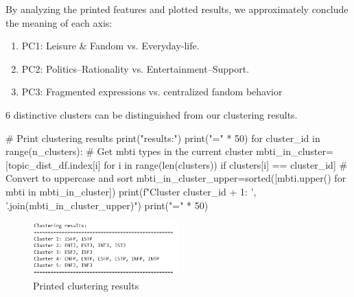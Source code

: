 \documentclass[12pt]{article}
\numberwithin{figure}{section}  %
\begin{document}
	By analyzing the printed features and plotted results, we approximately
	conclude the meaning of each axis:
	\begin{enumerate}
	\item PC1: Leisure \& Fandom vs. Everyday-life.
	\item PC2: Politics–Rationality vs. Entertainment–Support.
	\item PC3: Fragmented expressions vs. centralized fandom behavior
	\end{enumerate}
	
	6 distinctive clusters can be distinguished from our clustering results.
	\begin{python}
    # Print clustering results
    print("\nClustering results:")
    print("=" * 50)
    for cluster_id in range(n_clusters):
        # Get mbti types in the current cluster
        mbti_in_cluster=[topic_dist_df.index[i] for i in range(len(clusters)) if clusters[i] == cluster_id]
        # Convert to uppercase and sort
        mbti_in_cluster_upper=sorted([mbti.upper() for mbti in mbti_in_cluster])
        print(f"Cluster {cluster_id + 1}: {', '.join(mbti_in_cluster_upper)}")
    print("=" * 50)
	\end{python}

	\begin{figure}[H]
			\centering
			\includegraphics[width=0.5\textwidth]{Q2cluster1} 
			\caption{\centering Printed clustering results}		
	\end{figure}
	
\end{document}
